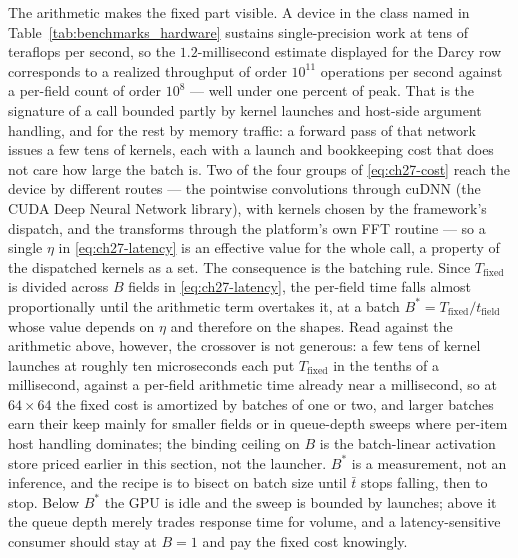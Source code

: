 The arithmetic makes the fixed part visible. A device in the class named in
Table~\ref{tab:benchmarks_hardware} sustains single-precision work at tens of
teraflops per second, so the $1.2$-millisecond estimate displayed for the Darcy row
corresponds to a realized throughput of order $10^{11}$ operations per second
against a per-field count of order $10^{8}$ --- well under one percent of peak.
That is the signature of a call bounded partly by kernel launches and host-side
argument handling, and for the rest by memory traffic: a forward pass of that
network issues a few tens of kernels, each with a launch and bookkeeping cost that
does not care how large the batch is. Two of the four groups of \eqref{eq:ch27-cost} reach
the device by different routes --- the pointwise convolutions through cuDNN (the
CUDA Deep Neural Network library), with kernels chosen by the framework's dispatch,
and the transforms through the platform's own FFT routine --- so a single $\eta$ in
\eqref{eq:ch27-latency} is an effective value for the whole call, a property of
the dispatched kernels as a set.
The consequence is the batching rule. Since
$T_{\mathrm{fixed}}$ is divided across $B$ fields in \eqref{eq:ch27-latency}, the
per-field time falls almost proportionally until the arithmetic term overtakes it,
at a batch $B^{*} = T_{\mathrm{fixed}}/t_{\mathrm{field}}$ whose value depends on
$\eta$ and therefore on the shapes. Read against the arithmetic above, however,
the crossover is not generous: a few tens of kernel launches at roughly ten
microseconds each put $T_{\mathrm{fixed}}$ in the tenths of a millisecond,
against a per-field arithmetic time already near a millisecond, so at
$64\times64$ the fixed cost is amortized by batches of one or two, and larger
batches earn their keep mainly for smaller fields or in queue-depth sweeps where
per-item host handling dominates; the binding ceiling on $B$ is the batch-linear
activation store priced earlier in this section, not the launcher. $B^{*}$ is a
measurement, not an inference, and
the recipe is to bisect on batch size until $\bar{t}$ stops falling, then to stop.
Below $B^{*}$ the GPU is idle and the sweep is bounded by launches; above it the
queue depth merely trades response time for volume, and a latency-sensitive
consumer should stay at $B=1$ and pay the fixed cost knowingly.

